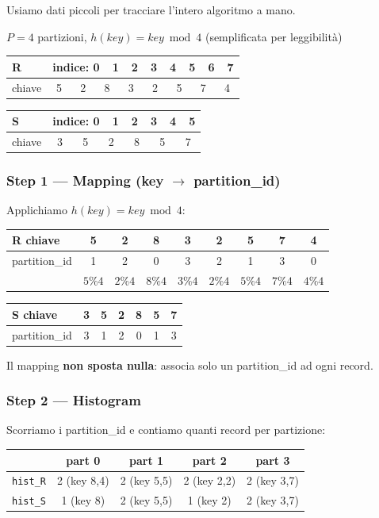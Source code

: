 \documentclass[11pt,a4paper]{article}
\begin{document}
Usiamo dati piccoli per tracciare l'intero algoritmo a mano.

\begin{bluebox}
$P = 4$ partizioni, \quad $h(\mathit{key}) = \mathit{key} \bmod 4$ \quad (semplificata per leggibilità)

\medskip
\begin{tabular}{l|cccccccc}
\textbf{R} & \multicolumn{8}{c}{indice: 0~~1~~2~~3~~4~~5~~6~~7}\\\hline
chiave & 5 & 2 & 8 & 3 & 2 & 5 & 7 & 4
\end{tabular}
\qquad
\begin{tabular}{l|cccccc}
\textbf{S} & \multicolumn{6}{c}{indice: 0~~1~~2~~3~~4~~5}\\\hline
chiave & 3 & 5 & 2 & 8 & 5 & 7
\end{tabular}
\end{bluebox}

\subsubsection{Step 1 --- Mapping (key $\to$ partition\_id)}

Applichiamo $h(\mathit{key}) = \mathit{key} \bmod 4$:

\begin{center}
\small
\begin{tabular}{l|cccccccc}
\textbf{R} chiave & 5 & 2 & 8 & 3 & 2 & 5 & 7 & 4\\\hline
partition\_id & 1 & 2 & 0 & 3 & 2 & 1 & 3 & 0\\
 & $5\%4$ & $2\%4$ & $8\%4$ & $3\%4$ & $2\%4$ & $5\%4$ & $7\%4$ & $4\%4$
\end{tabular}
\qquad
\begin{tabular}{l|cccccc}
\textbf{S} chiave & 3 & 5 & 2 & 8 & 5 & 7\\\hline
partition\_id & 3 & 1 & 2 & 0 & 1 & 3
\end{tabular}
\end{center}

Il mapping \textbf{non sposta nulla}: associa solo un partition\_id ad ogni record.

\subsubsection{Step 2 --- Histogram}

Scorriamo i partition\_id e contiamo quanti record per partizione:

\begin{center}
\begin{tabular}{c|cccc}
& \textbf{part 0} & \textbf{part 1} & \textbf{part 2} & \textbf{part 3}\\\hline
\texttt{hist\_R} & 2 (key 8,4) & 2 (key 5,5) & 2 (key 2,2) & 2 (key 3,7)\\
\texttt{hist\_S} & 1 (key 8) & 2 (key 5,5) & 1 (key 2) & 2 (key 3,7)
\end{tabular}
\end{center}
\end{document}
